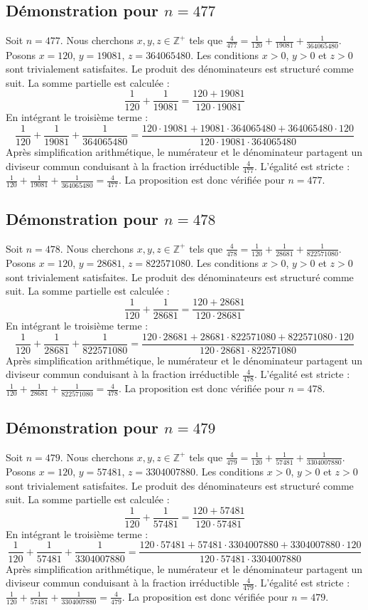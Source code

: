 \documentclass[11pt,a4paper]{article}
\begin{document}
\subsection{Démonstration pour $n = 477$}
Soit $n = 477$. Nous cherchons $x, y, z \in \mathbb{Z}^{+}$ tels que $\frac{4}{477} = \frac{1}{120} + \frac{1}{19081} + \frac{1}{364065480}$.
Posons $x = 120$, $y = 19081$, $z = 364065480$.
Les conditions $x > 0$, $y > 0$ et $z > 0$ sont trivialement satisfaites.
Le produit des dénominateurs est structuré comme suit. La somme partielle est calculée :
$$ \frac{1}{120} + \frac{1}{19081} = \frac{120+19081}{120 \cdot 19081} $$
En intégrant le troisième terme :
$$ \frac{1}{120} + \frac{1}{19081} + \frac{1}{364065480} = \frac{120 \cdot 19081 + 19081 \cdot 364065480 + 364065480 \cdot 120}{120 \cdot 19081 \cdot 364065480} $$
Après simplification arithmétique, le numérateur et le dénominateur partagent un diviseur commun conduisant à la fraction irréductible $\frac{4}{477}$.
L'égalité est stricte : $\frac{1}{120} + \frac{1}{19081} + \frac{1}{364065480} = \frac{4}{477}$.
La proposition est donc vérifiée pour $n = 477$.
\subsection{Démonstration pour $n = 478$}
Soit $n = 478$. Nous cherchons $x, y, z \in \mathbb{Z}^{+}$ tels que $\frac{4}{478} = \frac{1}{120} + \frac{1}{28681} + \frac{1}{822571080}$.
Posons $x = 120$, $y = 28681$, $z = 822571080$.
Les conditions $x > 0$, $y > 0$ et $z > 0$ sont trivialement satisfaites.
Le produit des dénominateurs est structuré comme suit. La somme partielle est calculée :
$$ \frac{1}{120} + \frac{1}{28681} = \frac{120+28681}{120 \cdot 28681} $$
En intégrant le troisième terme :
$$ \frac{1}{120} + \frac{1}{28681} + \frac{1}{822571080} = \frac{120 \cdot 28681 + 28681 \cdot 822571080 + 822571080 \cdot 120}{120 \cdot 28681 \cdot 822571080} $$
Après simplification arithmétique, le numérateur et le dénominateur partagent un diviseur commun conduisant à la fraction irréductible $\frac{4}{478}$.
L'égalité est stricte : $\frac{1}{120} + \frac{1}{28681} + \frac{1}{822571080} = \frac{4}{478}$.
La proposition est donc vérifiée pour $n = 478$.
\subsection{Démonstration pour $n = 479$}
Soit $n = 479$. Nous cherchons $x, y, z \in \mathbb{Z}^{+}$ tels que $\frac{4}{479} = \frac{1}{120} + \frac{1}{57481} + \frac{1}{3304007880}$.
Posons $x = 120$, $y = 57481$, $z = 3304007880$.
Les conditions $x > 0$, $y > 0$ et $z > 0$ sont trivialement satisfaites.
Le produit des dénominateurs est structuré comme suit. La somme partielle est calculée :
$$ \frac{1}{120} + \frac{1}{57481} = \frac{120+57481}{120 \cdot 57481} $$
En intégrant le troisième terme :
$$ \frac{1}{120} + \frac{1}{57481} + \frac{1}{3304007880} = \frac{120 \cdot 57481 + 57481 \cdot 3304007880 + 3304007880 \cdot 120}{120 \cdot 57481 \cdot 3304007880} $$
Après simplification arithmétique, le numérateur et le dénominateur partagent un diviseur commun conduisant à la fraction irréductible $\frac{4}{479}$.
L'égalité est stricte : $\frac{1}{120} + \frac{1}{57481} + \frac{1}{3304007880} = \frac{4}{479}$.
La proposition est donc vérifiée pour $n = 479$.
\end{document}
